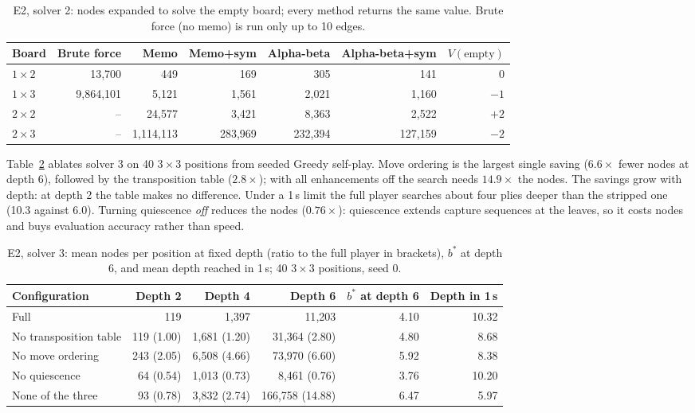 \documentclass[11pt,a4paper]{article}
\newcommand{\bd}[2]{$#1{\times}#2$}            %
\begin{document}
\begin{table}[htbp]
\centering
\caption{E2, solver 2: nodes expanded to solve the empty board; every method returns the
same value. Brute force (no memo) is run only up to 10 edges.}
\label{tab:e2exact}
\begin{tabular}{lrrrrrr}
\toprule
Board & Brute force & Memo & Memo+sym & Alpha-beta & Alpha-beta+sym & $V(\text{empty})$ \\
\midrule
\bd{1}{2} & 13{,}700 & 449 & 169 & 305 & 141 & 0 \\
\bd{1}{3} & 9{,}864{,}101 & 5{,}121 & 1{,}561 & 2{,}021 & 1{,}160 & $-1$ \\
\bd{2}{2} & -- & 24{,}577 & 3{,}421 & 8{,}363 & 2{,}522 & $+2$ \\
\bd{2}{3} & -- & 1{,}114{,}113 & 283{,}969 & 232{,}394 & 127{,}159 & $-2$ \\
\bottomrule
\end{tabular}
\end{table}

Table~\ref{tab:e2search} ablates solver 3 on 40 \bd{3}{3} positions from seeded Greedy
self-play. Move ordering is the largest single saving ($6.6\times$ fewer nodes at depth
6), followed by the transposition table ($2.8\times$); with all enhancements off the
search needs $14.9\times$ the nodes. The savings grow with depth: at depth 2 the table makes
no difference. Under a 1\,s limit the full player searches about four
plies deeper than the stripped one (10.3 against 6.0). Turning quiescence \emph{off}
reduces the nodes ($0.76\times$): quiescence extends capture sequences at the leaves, so it
costs nodes and buys evaluation accuracy rather than speed.

\begin{table}[htbp]
\centering
\caption{E2, solver 3: mean nodes per position at fixed depth (ratio to the full player
in brackets), $b^*$ at depth 6, and mean depth reached in 1\,s; 40 \bd{3}{3} positions,
seed 0.}
\label{tab:e2search}
\small
\begin{tabular}{lrrrrr}
\toprule
Configuration & Depth 2 & Depth 4 & Depth 6 & $b^*$ at depth 6 & Depth in 1\,s \\
\midrule
Full & 119 & 1{,}397 & 11{,}203 & 4.10 & 10.32 \\
No transposition table & 119 (1.00) & 1{,}681 (1.20) & 31{,}364 (2.80) & 4.80 & 8.68 \\
No move ordering & 243 (2.05) & 6{,}508 (4.66) & 73{,}970 (6.60) & 5.92 & 8.38 \\
No quiescence & 64 (0.54) & 1{,}013 (0.73) & 8{,}461 (0.76) & 3.76 & 10.20 \\
None of the three & 93 (0.78) & 3{,}832 (2.74) & 166{,}758 (14.88) & 6.47 & 5.97 \\
\bottomrule
\end{tabular}
\end{table}
\end{document}
